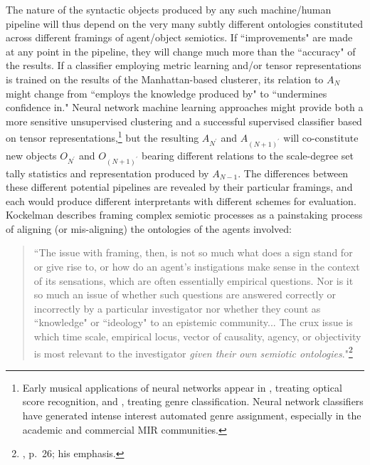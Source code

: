 The nature of the syntactic objects produced by any such machine/human pipeline will thus depend on the very many subtly different ontologies constituted across different framings of agent/object semiotics.  If ``improvements" are made at any point in the pipeline, they will change much more than the ``accuracy" of the results.  If a classifier employing metric learning and/or tensor representations is trained on the results of the Manhattan-based clusterer, its relation to $A_N$ might change from ``employs the knowledge produced by"  to ``undermines confidence in."  Neural network machine learning approaches might provide both a more sensitive unsupervised clustering and a successful supervised classifier based on tensor representations,\footnote{Early musical applications of neural networks appear in \cite{miyao1995}, treating optical score recognition, and \cite{matityaho1995}, treating genre classification.  Neural network classifiers have generated intense interest automated genre assignment, especially in the academic and commercial MIR communities.} but the resulting $A_{N^{\prime}}$ and $A_{(N+1)^{\prime}}$ will co-constitute new objects $O_{N^{\prime}}$ and $O_{(N+1)^{\prime}}$ bearing different relations to the scale-degree set tally statistics and representation produced by $A_{N-1}$.  The differences between these different potential pipelines are revealed by their particular framings, and each would produce different interpretants with different schemes for evaluation.  Kockelman describes framing complex semiotic processes as a painstaking process of aligning (or mis-aligning) the ontologies of the agents involved:
\begin{quote}
``The issue with framing, then, is not so much what does a sign stand for or give rise to, or how do an agent's instigations make sense in the context of its sensations, which are often essentially empirical questions.  Nor is it so much an issue of whether such questions are answered correctly or incorrectly by a particular investigator nor whether they count as ``knowledge" or ``ideology" to an epistemic community... The crux issue is which time scale, empirical locus, vector of causality, agency, or objectivity is most relevant to the investigator \emph{given their own semiotic ontologies}."\footnote{\cite{kockelman2013}, p.\ 26; his emphasis.}
\end{quote}
